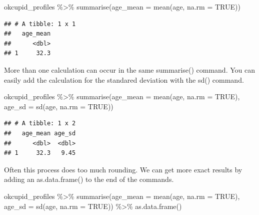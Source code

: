 \documentclass[
]{krantz}
\makeatletter
\newenvironment{Shaded}{\begin{snugshade}}{\end{snugshade}}
\newcommand{\AttributeTok}[1]{\textcolor[rgb]{0.61,0.61,0.61}{#1}}
\newcommand{\ConstantTok}[1]{\textcolor[rgb]{0,0,0}{#1}}
\newcommand{\FunctionTok}[1]{\textcolor[rgb]{0,0,0}{#1}}
\newcommand{\NormalTok}[1]{#1}
\newcommand{\SpecialCharTok}[1]{\textcolor[rgb]{0,0,0}{#1}}
\newenvironment{kframe}{%
\medskip{}
\setlength{\fboxsep}{.8em}
 \def\at@end@of@kframe{}%
 \ifinner\ifhmode%
  \def\at@end@of@kframe{\end{minipage}}%
  \begin{minipage}{\columnwidth}%
 \fi\fi%
 \def\FrameCommand##1{\hskip\@totalleftmargin \hskip-\fboxsep
 \colorbox{shadecolor}{##1}\hskip-\fboxsep
     \hskip-\linewidth \hskip-\@totalleftmargin \hskip\columnwidth}%
 \MakeFramed {\advance\hsize-\width
   \@totalleftmargin\z@ \linewidth\hsize
   \@setminipage}}%
 {\par\unskip\endMakeFramed%
 \at@end@of@kframe}
\renewenvironment{Shaded}{\begin{kframe}}{\end{kframe}}
\makeatother
\begin{document}
\begin{Shaded}
\begin{Highlighting}[]
\NormalTok{okcupid\_profiles }\SpecialCharTok{\%\textgreater{}\%} 
  \FunctionTok{summarise}\NormalTok{(}\AttributeTok{age\_mean =} \FunctionTok{mean}\NormalTok{(age, }\AttributeTok{na.rm =} \ConstantTok{TRUE}\NormalTok{))}
\end{Highlighting}
\end{Shaded}

\begin{verbatim}
## # A tibble: 1 x 1
##   age_mean
##      <dbl>
## 1     32.3
\end{verbatim}

More than one calculation can occur in the same summarise() command. You can easily add the calculation for the standared deviation with the sd() command.

\begin{Shaded}
\begin{Highlighting}[]
\NormalTok{okcupid\_profiles }\SpecialCharTok{\%\textgreater{}\%} 
  \FunctionTok{summarise}\NormalTok{(}\AttributeTok{age\_mean =} \FunctionTok{mean}\NormalTok{(age, }\AttributeTok{na.rm =} \ConstantTok{TRUE}\NormalTok{),}
            \AttributeTok{age\_sd =} \FunctionTok{sd}\NormalTok{(age, }\AttributeTok{na.rm =} \ConstantTok{TRUE}\NormalTok{))}
\end{Highlighting}
\end{Shaded}

\begin{verbatim}
## # A tibble: 1 x 2
##   age_mean age_sd
##      <dbl>  <dbl>
## 1     32.3   9.45
\end{verbatim}

Often this process does too much rounding. We can get more exact results by adding an as.data.frame() to the end of the commands.

\begin{Shaded}
\begin{Highlighting}[]
\NormalTok{okcupid\_profiles }\SpecialCharTok{\%\textgreater{}\%} 
  \FunctionTok{summarise}\NormalTok{(}\AttributeTok{age\_mean =} \FunctionTok{mean}\NormalTok{(age, }\AttributeTok{na.rm =} \ConstantTok{TRUE}\NormalTok{),}
            \AttributeTok{age\_sd =} \FunctionTok{sd}\NormalTok{(age, }\AttributeTok{na.rm =} \ConstantTok{TRUE}\NormalTok{)) }\SpecialCharTok{\%\textgreater{}\%}
  \FunctionTok{as.data.frame}\NormalTok{()}
\end{Highlighting}
\end{Shaded}
\end{document}
